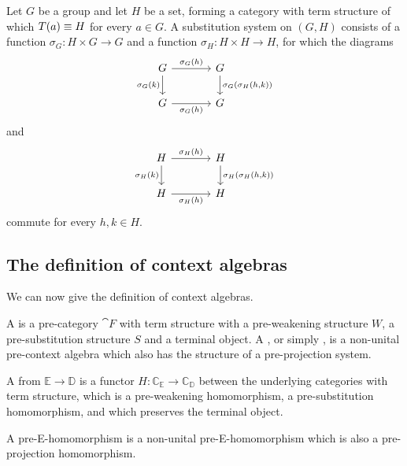 \begin{eg}
Let $G$ be a group and let $H$ be a set, forming a category with term 
structure of which $T(a)\equiv H$ for every $a\in G$. A substitution
system on $(G,H)$ consists of a function $\sigma_G : H\times G\to G$ and
a function $\sigma_H:H\times H\to H$, for which the diagrams
\begin{equation*}
\begin{tikzcd}[column sep=large]
G \arrow[r,"\sigma_G(h)"]
  \arrow[d,swap,"\sigma_G(k)"]
  &
G \arrow[d,"{\sigma_G(\sigma_H(h,k))}"]
  \\
G \arrow[r,swap,"\sigma_G(h)"] 
& G
\end{tikzcd}
\end{equation*}
and
\begin{equation*}
\begin{tikzcd}[column sep=large]
H \arrow[r,"\sigma_H(h)"]
  \arrow[d,swap,"\sigma_H(k)"]
  &
H \arrow[d,"{\sigma_H(\sigma_H(h,k))}"]
  \\
H \arrow[r,swap,"\sigma_H(h)"]
  &
H
\end{tikzcd}
\end{equation*}
commute for every $h,k\in H$. 
\end{eg}

\subsection{The definition of context algebras}

We can now give the definition of context algebras.

\begin{defn}
A  is a pre-category $\cat{F}$ with term structure
with a pre-weakening structure $W$, a pre-substitution structure $S$ and a terminal
object. A , or simply , is a non-unital pre-context algebra which also has the structure of a pre-projection system. 
\end{defn}

\begin{defn}
A  from $\mathbb{E}\to\mathbb{D}$ is a functor
$H:\mathbb{C}_\mathbb{E}\to\mathbb{C}_\mathbb{D}$ between the underlying categories
with term structure, which is a pre-weakening homomorphism, a pre-substitution
homomorphism, and which preserves the terminal object. 

A  pre-E-homomorphism is a non-unital pre-E-homomorphism which is 
also a pre-projection homomorphism. 
\end{defn}

